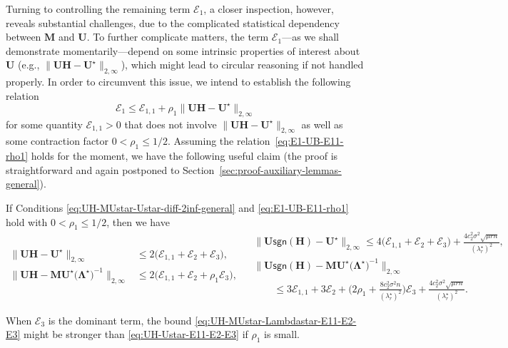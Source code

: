 Turning to controlling the remaining term $\mathcal{E}_{1}$, a closer inspection, however, reveals substantial challenges, due to the complicated statistical dependency between $\bm{M}$ and $\bm{U}$. To further complicate matters, the term $\mathcal{E}_1$---as we shall demonstrate momentarily---depend on some intrinsic properties of interest about $\bm{U}$ (e.g., $\|\bm{U}\bm{H}-\bm{U}^{\star}\|_{2,\infty}$),  which might lead to circular reasoning if not handled properly. In order to circumvent this issue, we intend to establish the following relation
%
\begin{equation}
	\mathcal{E}_{1}\leq\mathcal{E}_{1,1}+\rho_{1}\big\|\bm{U}\bm{H}-\bm{U}^{\star}\big\|_{2,\infty}
	\label{eq:E1-UB-E11-rho1}
\end{equation}
%
for some quantity $\mathcal{E}_{1,1}>0$ that does not involve $\|\bm{U}\bm{H}-\bm{U}^{\star} \|_{2,\infty}$  as well as some contraction factor $0<\rho_{1}\leq1/2$. Assuming the relation~\eqref{eq:E1-UB-E11-rho1} holds for the moment, we have the following useful claim (the proof is straightforward and again postponed to Section~\ref{sec:proof-auxiliary-lemmas-general}).
%
\begin{lemma}
\label{lem:UH-sequence-bounds-E123}
If Conditions \eqref{eq:UH-MUstar-Ustar-diff-2inf-general} and \eqref{eq:E1-UB-E11-rho1} hold with $0<\rho_{1}\leq1/2$, then we have
%
\begin{subequations}\label{eq:UH-sequence-bounds-E123}
\begin{align}
\big\|\bm{U}\bm{H}-\bm{U}^{\star}\big\|_{2,\infty} & \leq2\big(\mathcal{E}_{1,1}+\mathcal{E}_{2}+\mathcal{E}_{3}\big), \label{eq:UH-Ustar-E11-E2-E3}\\
\big\|\bm{U}\bm{H}-\bm{M}\bm{U}^{\star}\big(\bm{\Lambda}^{\star}\big)^{-1}\big\|_{2,\infty} & \leq2\big(\mathcal{E}_{1,1}+\mathcal{E}_{2}+\rho_{1}\mathcal{E}_{3}\big),
\label{eq:UH-MUstar-Lambdastar-E11-E2-E3}
\end{align}
\begin{align}
	& \big\|\bm{U}\mathsf{sgn}(\bm{H})-\bm{U}^{\star}\big\|_{2,\infty}  \leq4\big(\mathcal{E}_{1,1}+\mathcal{E}_{2}+\mathcal{E}_{3}\big)+\frac{4c_{2}^{2}\sigma^{2}\sqrt{\mu rn}}{(\lambda_{r}^{\star})^{2}}, \label{eq:UsgnH-Ustar-Lambdastar-E11-E2-E3} \\
	& \big\|\bm{U}\mathsf{sgn}(\bm{H})-\bm{M}\bm{U}^{\star}\big(\bm{\Lambda}^{\star}\big)^{-1}\big\|_{2,\infty} \nonumber \\
& \qquad \leq3\mathcal{E}_{1,1}+3\mathcal{E}_{2}+\Big(2\rho_{1}+\frac{8c_{2}^{2}\sigma^{2}n}{(\lambda_{r}^{\star})^{2}}\Big)\mathcal{E}_{3}
 +\frac{4c_{2}^{2}\sigma^{2}\sqrt{\mu rn}}{(\lambda_{r}^{\star})^{2}}.\label{eq:UsgnH-MUstar-Lambdastar-E11-E2-E3}
\end{align}
\end{subequations}
%
\end{lemma}
%
\begin{remark}
When $\mathcal{E}_3$ is the dominant term, the  bound   \eqref{eq:UH-MUstar-Lambdastar-E11-E2-E3}  might be stronger than \eqref{eq:UH-Ustar-E11-E2-E3} if $\rho_1$ is  small. %
\end{remark}


